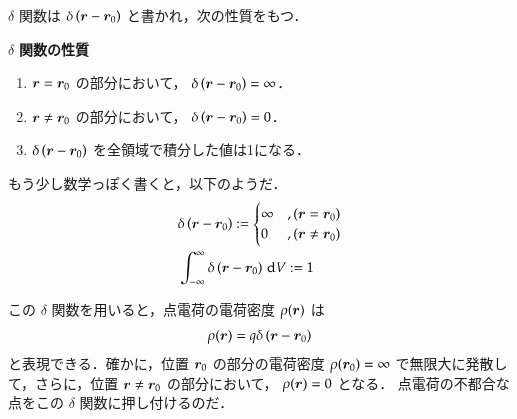             $\delta$ 関数は $\delta\left( \boldsymbol{r} - \boldsymbol{r}_{0}\right)$ と書かれ，次の性質をもつ．
                    \begin{center}
                        \begin{itembox}[l]{$\delta$ \textbf{関数の性質}}
                        \begin{enumerate}
                                \item $\boldsymbol{r} = \boldsymbol{r}_{0}$ の部分において，
                                         $\delta\left( \boldsymbol{r} -\boldsymbol{r}_{0}\right)=\infty$．
                                \item $\boldsymbol{r}\neq\boldsymbol{r}_{0}$ の部分において，
                                         $\delta\left( \boldsymbol{r} -\boldsymbol{r}_{0}\right)=0$．
                                \item $\delta\left( \boldsymbol{r} -\boldsymbol{r}_{0}\right)$ を全領域で積分した値は1になる．
                        \end{enumerate}
                        \end{itembox}
                    \end{center}

                        もう少し数学っぽく書くと，以下のようだ．
                \begin{align}
                                          &\delta\left( \boldsymbol{r} -\boldsymbol{r}_{0}\right) :=
                                          \begin{cases}
                                            \infty   &, (\boldsymbol{r} = \boldsymbol{r}_{0})  \\
                                            0        &, (\boldsymbol{r}\neq\boldsymbol{r}_{0})
                                          \end{cases} \\
                                          &\int_{-\infty}^{\infty} \delta\left( \boldsymbol{r} -\boldsymbol{r}_{0}\right) \,\mathrm{d} V := 1
                \end{align}

            この $\delta$ 関数を用いると，点電荷の電荷密度 $\rho(\boldsymbol{r})$ は
                \begin{align}
                    \rho(\boldsymbol{r})=q\delta\left( \boldsymbol{r}-\boldsymbol{r}_{0}\right)
                \end{align}
            と表現できる．確かに，位置 $\boldsymbol{r}_{0}$ の部分の電荷密度 $\rho(\boldsymbol{r}_{0})=\infty$ で無限大に発散し
            て，さらに，位置 $\boldsymbol{r}\neq\boldsymbol{r}_{0}$ の部分において， $\rho(\boldsymbol{r})=0$ となる．
                点電荷の不都合な点をこの $\delta$ 関数に押し付けるのだ．

